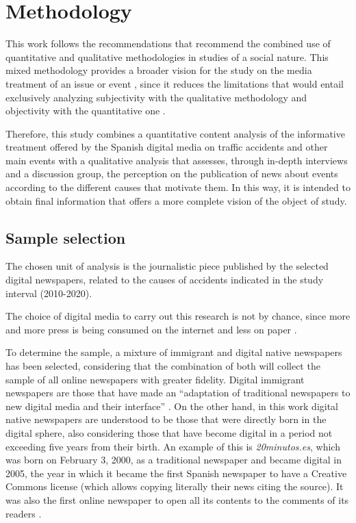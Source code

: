 \section{Methodology}\label{sec-methodology}

This work follows the recommendations that recommend the combined use of
quantitative and qualitative methodologies in studies of a social
nature. This mixed methodology provides a broader vision for the study
on the media treatment of an issue or event \cite{jensen2015comunicacion}, since it
reduces the limitations that would entail exclusively analyzing
subjectivity with the qualitative methodology and objectivity with the
quantitative one \cite{sanchezgomez2015}.

Therefore, this study combines a quantitative content analysis of the
informative treatment offered by the Spanish digital media on traffic
accidents and other main events with a qualitative analysis that
assesses, through in-depth interviews and a discussion group, the
perception on the publication of news about events according to the
different causes that motivate them. In this way, it is intended to
obtain final information that offers a more complete vision of the
object of study.

\subsection{Sample selection}\label{sub-sec-sampleselection}

The chosen unit of analysis is the journalistic piece published by the
selected digital newspapers, related to the causes of accidents
indicated in the study interval (2010-2020).

The choice of digital media to carry out this research is not by chance,
since more and more press is being consumed on the internet and less on
paper \cite{boasberg2019marco}.

To determine the sample, a mixture of immigrant and digital native
newspapers has been selected, considering that the combination of both
will collect the sample of all online newspapers with greater fidelity.
Digital immigrant newspapers are those that have made an \enquote{adaptation of
traditional newspapers to new digital media and their interface}
\cite[p. 27]{peña2016european}. On the other hand, in this work digital native newspapers are understood to be those that were directly born in the digital sphere, also considering
those that have become digital in a period not exceeding five years from
their birth. An example of this is \emph{20minutos.es}, which was born
on February 3, 2000, as a traditional newspaper and became digital in
2005, the year in which it became the first Spanish newspaper to have a
Creative Commons license (which allows copying literally their news
citing the source). It was also the first online newspaper to open all
its contents to the comments of its readers \cite{lopez2012tratamiento}.

